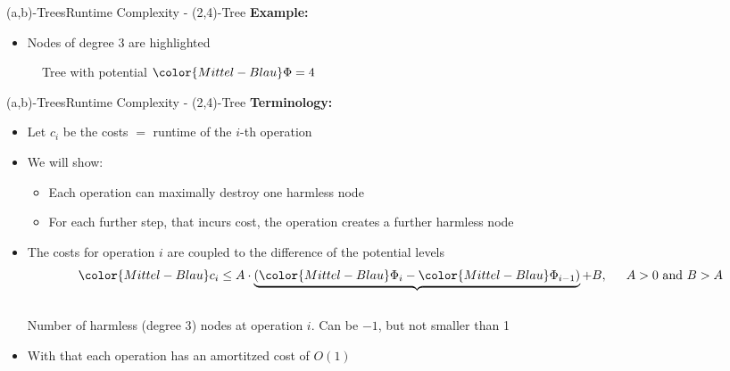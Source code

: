 \begin{frame}{(a,b)-Trees}{Runtime Complexity - (2,4)-Tree}
  \textbf{Example:}
  \begin{itemize}
    \item<2->
      Nodes of {\color{Mittel-Blau}degree 3} are highlighted
  \end{itemize}
  \begin{figure}[!h]
    \begin{adjustbox}{width=0.8\linewidth}
      
    \end{adjustbox}
    \caption{Tree with potential ${\color{Mittel-Blau}\Phi} = 4$}
    \label{fig:a_b_tree:potential_introduction}
  \end{figure}
\end{frame}


\begin{frame}{(a,b)-Trees}{Runtime Complexity - (2,4)-Tree}
  \textbf{Terminology:}
  \begin{itemize}
    \item<2->
      Let {\color{Mittel-Blau}$c_i$} be the costs $=$ runtime of the {\color{Mittel-Blau}$i$}-th operation
    \item<3->
      We will show:
      \begin{itemize}
      \item<4-> Each operation can maximally destroy one harmless node
      \item<5-> For each further step, that incurs cost, the operation
        creates a further harmless node
     \end{itemize} 
    \item<6->
      The costs for operation {\color{Mittel-Blau}$i$} are coupled to the
      difference of the potential levels
      \begin{displaymath}
        {\color{Mittel-Blau}c_i} \leq A \cdot \underbrace{(
          {\color{Mittel-Blau}\Phi_i} -
          {\color{Mittel-Blau}\Phi_{i-1}}
        )} + B, \hspace{1.5em} A > 0 \text{ and } B > A
      \end{displaymath}\\
      \vspace{-0.75em}
      Number of harmless ({\color{Mittel-Blau}degree 3}) nodes at operation
      {\color{Mittel-Blau}$i$}. Can be $-1$, but not smaller than 1
      \item<7->
      With that each operation has an amortitzed cost of
      {\color{Mittel-Blau}$O(1)$}
  \end{itemize}
\end{frame}

